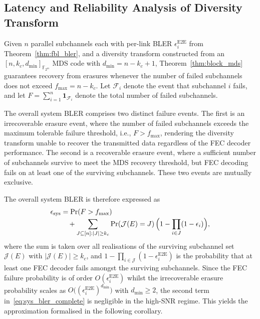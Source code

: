 \documentclass[journal]{IEEEtran}
\begin{document}
\subsection{Latency and Reliability Analysis of Diversity Transform}
\label{sec:latency_reliability}

Given $n$ parallel subchannels each with per-link BLER
$\epsilon_i^{\mathrm{E2E}}$ from Theorem~\ref{thm:fbl_bler}, and a
diversity transform constructed from an
$[n, k_c, d_{\min}]_{\mathbb{F}_{2^m}}$ MDS code with
$d_{\min} = n - k_c + 1$, Theorem~\ref{thm:block_mds} guarantees
recovery from erasures whenever the number of failed subchannels does not
exceed $f_{\max} = n - k_c$. Let $\mathcal{F}_i$ denote the event
that subchannel $i$ fails, and let
$F = \sum_{i=1}^n \mathbf{1}_{\mathcal{F}_i}$ denote the total
number of failed subchannels.

The overall system BLER comprises two distinct failure events.
The first is an irrecoverable erasure event, where the number of
failed subchannels exceeds the maximum tolerable failure threshold,
i.e., $F > f_{\max}$, rendering the diversity transform unable to
recover the transmitted data regardless of the FEC decoder
performance. The second is a recoverable erasure event, where a
sufficient number of subchannels survive to meet the MDS recovery
threshold, but FEC decoding fails on at least one of the surviving
subchannels. These two events are mutually exclusive.

The overall system BLER is therefore expressed as
\begin{equation}
\begin{aligned}
\epsilon_{\mathrm{sys}} &= \Pr\!\left(F > f_{\max}\right) \\[-2pt]
&\quad + \sum_{J\subseteq[n]:|J|\geq k_c}
\Pr\!\left(\mathcal{J}(E)=J\right)
\Bigl(1 - \prod_{i\in J}(1-\epsilon_i)\Bigr),
\label{eq:sys_bler_complete}
\end{aligned}
\end{equation}
where the sum is taken over all realisations of the surviving
subchannel set $\mathcal{J}(E)$ with $|\mathcal{J}(E)| \geq k_c$,
and $1 - \prod_{i \in \mathcal{J}}(1-\epsilon_i^{\mathrm{E2E}})$
is the probability that at least one FEC decoder fails amongst the
surviving subchannels. Since the FEC failure probability is of order
$O(\epsilon_i^{\mathrm{E2E}})$ whilst the irrecoverable erasure
probability scales as
$O\bigl((\epsilon_i^{\mathrm{E2E}})^{d_{\min}}\bigr)$ with
$d_{\min} \geq 2$, the second term
in~\eqref{eq:sys_bler_complete} is negligible in the high-SNR
regime. This yields the approximation formalised in the following
corollary.
\end{document}
